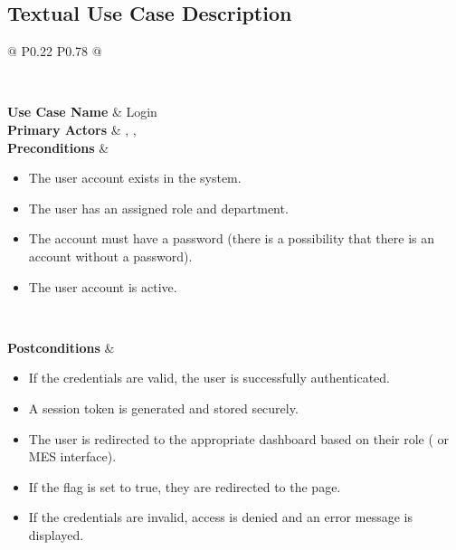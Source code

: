 \subsection{Textual Use Case Description}

\begin{longtable}{@{} P{0.22\linewidth} P{0.78\linewidth} @{}}
	
	\toprule
	\endfirsthead
	
	\midrule
	\endhead
	
	\\
	\endfoot
	
	\endlastfoot
	
	\textbf{Use Case Name}  & Login                                                                \\
	\midrule
	\textbf{Primary Actors} & , ,  \\
	\midrule
	\textbf{Preconditions}  &                                                                      
	\begin{itemize}[noitemsep, topsep=0pt, partopsep=0pt, leftmargin=*]
	\item The user account exists in the  system.
	\item The user has an assigned role and department.
	\item The account must have a password (there is a possibility that
	there is an account without a password).
	\item The user account is active.
	\end{itemize} \\
	\midrule
	
	\textbf{Postconditions} &                                                                      
	\begin{itemize}[noitemsep, topsep=0pt, partopsep=0pt, leftmargin=*]
	\item If the credentials are valid, the user is successfully authenticated.
	\item A session token is generated and stored securely.
	\item The user is redirected to the appropriate dashboard based on their
	role ( or MES interface).
	\item If the  flag is set to true, they
	are redirected to the  page.
	\item If the credentials are invalid, access is denied and an error
	message is displayed.
	\end{itemize} \\
	\midrule
	

\end{longtable}
